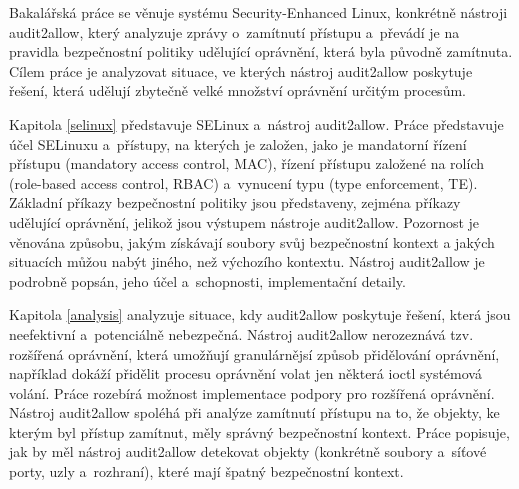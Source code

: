 Bakalářská práce se věnuje systému Security-Enhanced Linux, konkrétně nástroji
audit2allow, který analyzuje zprávy o~zamítnutí přístupu a~převádí je na
pravidla bezpečnostní politiky udělující oprávnění, která byla původně
zamítnuta. Cílem práce je analyzovat situace, ve kterých nástroj audit2allow
poskytuje řešení, která udělují zbytečně velké množství oprávnění určitým
procesům.

Kapitola \ref{selinux} představuje SELinux a~nástroj audit2allow. Práce
představuje účel SELinuxu a~přístupy, na kterých je založen, jako je mandatorní
řízení přístupu (mandatory access control, MAC), řízení přístupu založené na
rolích (role-based access control, RBAC) a~vynucení typu (type enforcement, TE).
Základní příkazy bezpečnostní politiky jsou představeny, zejména příkazy
udělující oprávnění, jelikož jsou výstupem nástroje audit2allow. Pozornost je
věnována způsobu, jakým získávají soubory svůj bezpečnostní kontext a jakých
situacích můžou nabýt jiného, než výchozího kontextu. Nástroj audit2allow je
podrobně popsán, jeho účel a~schopnosti, implementační detaily.

Kapitola \ref{analysis} analyzuje situace, kdy audit2allow poskytuje řešení,
která jsou neefektivní a~potenciálně nebezpečná. Nástroj audit2allow nerozeznává
tzv. rozšířená oprávnění, která umožňují granulárnějsí způsob přidělování
oprávnění, například dokáží přidělit procesu oprávnění volat jen některá ioctl
systémová volání. Práce rozebírá možnost implementace podpory pro rozšířená
oprávnění. Nástroj audit2allow spoléhá při analýze zamítnutí přístupu na to, že
objekty, ke kterým byl přístup zamítnut, měly správný bezpečnostní kontext.
Práce popisuje, jak by měl nástroj audit2allow detekovat objekty (konkrétně
soubory a~síťové porty, uzly a~rozhraní), které mají špatný bezpečnostní
kontext.

